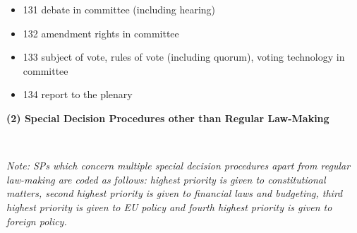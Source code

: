 \documentclass[10pt,]{article}
\providecommand{\tightlist}{%
  \setlength{\itemsep}{0pt}\setlength{\parskip}{0pt}}
\begin{document}
\begin{itemize}
  \begin{itemize}
  \tightlist
  \item
    131 debate in committee (including hearing)
  \item
    132 amendment rights in committee
  \item
    133 subject of vote, rules of vote (including quorum), voting
    technology in committee
  \item
    134 report to the plenary
  \end{itemize}
\end{itemize}

\textbf{(2) Special Decision Procedures other than Regular Law-Making}

~

\emph{Note: SPs which concern multiple special decision procedures apart
from regular law-making are coded as follows: highest priority is given
to constitutional matters, second highest priority is given to financial
laws and budgeting, third highest priority is given to EU policy and
fourth highest priority is given to foreign policy.}
\end{document}

